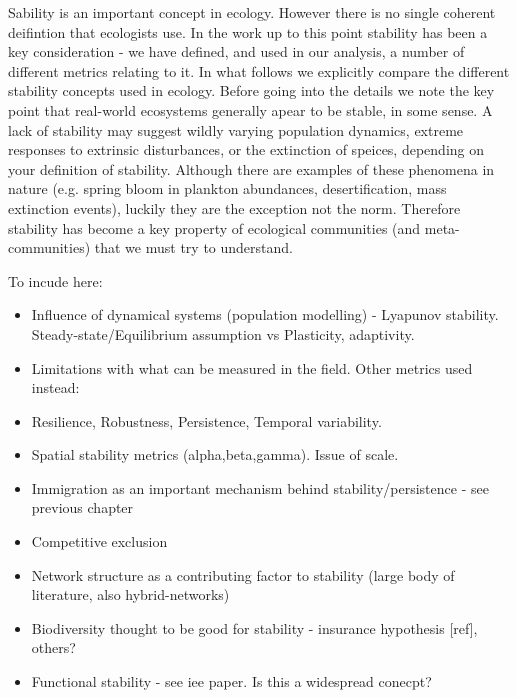 Sability is an important concept in ecology. However there is no single coherent deifintion that ecologists use. In the work up to this point stability has been a key consideration - we have defined, and used in our analysis, a number of different metrics relating to it. In what follows we explicitly compare the different stability concepts used in ecology. Before going into the details we note the key point that real-world ecosystems generally apear to be stable, in some sense. A lack of stability may suggest wildly varying population dynamics, extreme responses to extrinsic disturbances, or the extinction of speices, depending on your definition of stability. Although there are examples of these phenomena in nature (e.g. spring bloom in plankton abundances, desertification, mass extinction events), luckily they are the exception not the norm. Therefore stability has become a key property of ecological communities (and meta-communities) that we must try to understand. 


To incude here:

\begin{itemize}

\item Influence of dynamical systems (population modelling) - Lyapunov stability. Steady-state/Equilibrium assumption vs Plasticity, adaptivity.

\item Limitations with what can be measured in the field. Other metrics used instead: 

\item Resilience, Robustness, Persistence, Temporal variability. 

\item Spatial stability metrics (alpha,beta,gamma). Issue of scale. \cite{wang2014ecosystem}

\item Immigration as an important mechanism behind stability/persistence - see previous chapter

\item Competitive exclusion

\item Network structure as a contributing factor to stability (large body of literature, also hybrid-networks)

\item Biodiversity thought to be good for stability - insurance hypothesis [ref], others?

\item Functional stability - see iee paper. Is this a widespread conecpt?
\end{itemize}


